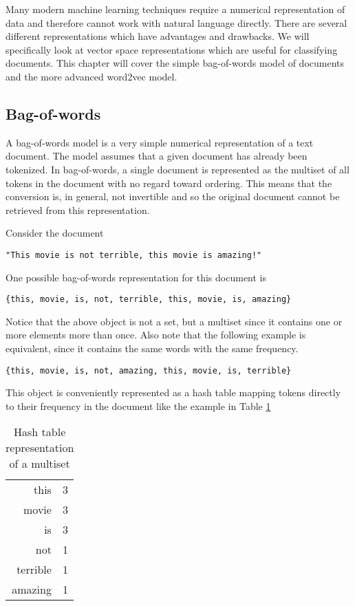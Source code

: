 Many modern machine learning techniques require a numerical representation of data and therefore cannot work with natural language directly.  There are several different representations which have advantages and drawbacks.  We will specifically look at vector space representations which are useful for classifying documents.  This chapter will cover the simple bag-of-words model of documents and the more advanced word2vec model.

\subsection{Bag-of-words} \label{sec:bow}
A bag-of-words model is a very simple numerical representation of a text document.  The model assumes that a given document has already been tokenized.  In bag-of-words, a single document is represented as the multiset of all tokens in the document with no regard toward ordering.  This means that the conversion is, in general, not invertible and so the original document cannot be retrieved from this representation.

Consider the document
\begin{center}
\texttt{"This movie is not terrible, this movie is amazing!"}
\end{center}
One possible bag-of-words representation for this document is
\begin{center}
\texttt{\{this, movie, is, not, terrible, this, movie, is, amazing\}}
\end{center}
Notice that the above object is not a set, but a multiset since it contains one or more elements more than once.  Also note that the following example is equivalent, since it contains the same words with the same frequency.
\begin{center}
\texttt{\{this, movie, is, not, amazing, this, movie, is, terrible\}}
\end{center}

This object is conveniently represented as a hash table mapping tokens directly to their frequency in the document like the example in Table \ref{tab:hash}
\begin{table}[h]
\centering
\begin{tabular}{ r l }
 this & 3 \\ 
 movie & 3 \\  
 is & 3 \\ 
 not & 1 \\
 terrible & 1 \\
 amazing & 1 \\
\end{tabular}
\caption{Hash table representation of a multiset}
\label{tab:hash}
\end{table}


